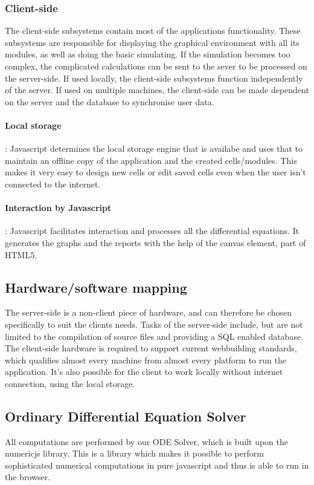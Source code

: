 \documentclass{report}
\begin{document}
			\subsubsection{Client-side}
				The client-side subsystems contain most of the applications functionality. These subsystems are responsible for displaying the graphical environment with all its modules, as well as doing the basic simulating. If the simulation becomes too complex, the complicated calculations can be sent to the sever to be processed on the server-side. If used locally, the client-side subsystems function independently of the server. If used on multiple machines, the client-side can be made dependent on the server and the database to synchronise user data.
				\paragraph{Local storage}
					: Javascript determines the local storage engine that is availabe and uses that to maintain an offline copy of the application and the created cells/modules. This makes it very easy to design new cells or edit saved cells even when the user isn't connected to the internet.
				\paragraph{Interaction by Javascript}
					: Javascript facilitates interaction and processes all the differential equations. It generates the graphs and the reports with the help of the canvas element, part of HTML5.

		\subsection{Hardware/software mapping}
			The server-side is a non-client piece of hardware, and can therefore be chosen specifically to suit the clients needs. Tasks of the server-side include, but are not limited to the compilation of source files and providing a SQL enabled database. The client-side hardware is required to support current webbuilding standards, which qualifies almost every machine from almost every platform to run the application. It's also possible for the client to work locally without internet connection, using the local storage.\\
			
\clearpage
		\subsection{Ordinary Differential Equation Solver}
			All computations are performed by our ODE Solver, which is built upon the numericjs library. This is a library which makes it possible to perform sophisticated numerical computations in pure javascript and thus is able to run in the browser.
\end{document}
